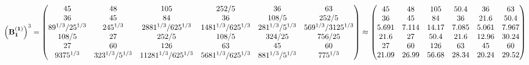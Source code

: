\documentclass[10pt,a4paper]{article}
\begin{document}
	\[
		\left(\bold{B_1^{(1)}}\right)^{3} = 
		\begin{pmatrix}
			{{45}}{} & {{48}}{} & {{105}}{} & {{252}} / {{5}} & {{36}}{} & {{63}}{} \\
			{{36}}{} & {{45}}{} & {{84}}{} & {{36}}{} & {{108}} / {{5}} & {{252}} / {{5}} \\
			{{8}{9^ {1 / 3}}} / {{25^ {1 / 3}}} & {{2}{45^ {1 / 3}}}{} & {{28}{81^ {1 / 3}}} / {{625^ {1 / 3}}} & {{14}{81^ {1 / 3}}} / {{625^ {1 / 3}}} & {{2}{81^ {1 / 3}}} / {{5^ {1 / 3}}} & {{56}{9^ {1 / 3}}} / {{3125^ {1 / 3}}} \\
			{{108}} / {{5}} & {{27}}{} & {{252}} / {{5}} & {{108}} / {{5}} & {{324}} / {{25}} & {{756}} / {{25}} \\
			{{27}}{} & {{60}}{} & {{126}}{} & {{63}}{} & {{45}}{} & {{60}}{} \\
			{{9375^ {1 / 3}}}{} & {{32}{3^ {1 / 3}}} / {{5^ {1 / 3}}} & {{112}{81^ {1 / 3}}} / {{625^ {1 / 3}}} & {{56}{81^ {1 / 3}}} / {{625^ {1 / 3}}} & {{8}{81^ {1 / 3}}} / {{5^ {1 / 3}}} & {{7}{75^ {1 / 3}}}{} \\
		\end{pmatrix}
		\approx
		\begin{pmatrix}
			45       & 48       & 105      & 50.4     & 36       & 63       \\
			36       & 45       & 84       & 36       & 21.6     & 50.4     \\
			5.691    & 7.114    & 14.17    & 7.085    & 5.061    & 7.967    \\
			21.6     & 27       & 50.4     & 21.6     & 12.96    & 30.24    \\
			27       & 60       & 126      & 63       & 45       & 60       \\
			21.09    & 26.99    & 56.68    & 28.34    & 20.24    & 29.52    \\
		\end{pmatrix}
	\]
\end{document}
